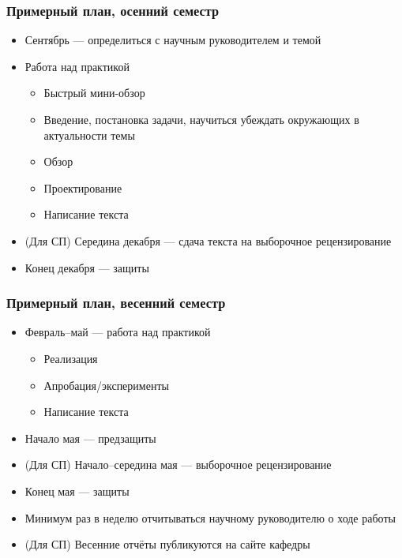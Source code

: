 \documentclass{../../slides-style}
\begin{document}
    \begin{frame}
        \frametitle{Примерный план, осенний семестр}
        \begin{itemize}
            \item Сентябрь --- определиться с научным руководителем и темой
            \item Работа над практикой
            \begin{itemize}
                \item Быстрый мини-обзор
                \item Введение, постановка задачи, научиться убеждать окружающих в актуальности темы
                \item Обзор
                \item Проектирование
                \item Написание текста
            \end{itemize}
            \item (Для СП) Середина декабря --- сдача текста на выборочное рецензирование
            \item Конец декабря --- защиты
        \end{itemize}
    \end{frame}

    \begin{frame}
        \frametitle{Примерный план, весенний семестр}
        \begin{itemize}
            \item Февраль--май --- работа над практикой
            \begin{itemize}
                \item Реализация
                \item Апробация/эксперименты
                \item Написание текста
            \end{itemize}
            \item Начало мая --- предзащиты
            \item (Для СП) Начало--середина мая --- выборочное рецензирование
            \item Конец мая --- защиты
            \item Минимум раз в неделю отчитываться научному руководителю о ходе работы
            \item (Для СП) Весенние отчёты публикуются на сайте кафедры
        \end{itemize}
    \end{frame}
\end{document}
